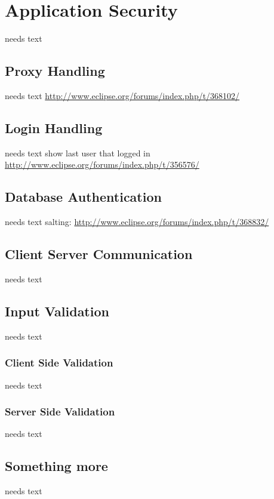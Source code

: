 \documentclass[a4paper,10pt,twoside]{book}
\begin{document}
  \sloppy
\fi


\chapter{Application Security}
needs text

\section{Proxy Handling}
needs text
\url{http://www.eclipse.org/forums/index.php/t/368102/}

\section{Login Handling}
needs text
show last user that logged in \url{http://www.eclipse.org/forums/index.php/t/356576/}

\section{Database Authentication}
needs text
salting: \url{http://www.eclipse.org/forums/index.php/t/368832/}

\section{Client Server Communication}
needs text

\section{Input Validation}
needs text

\subsection{Client Side Validation}
needs text

\subsection{Server Side Validation}
needs text

\section{Something more}
needs text


\ifx\wholebook\relax\else
   
   
\end{document}
